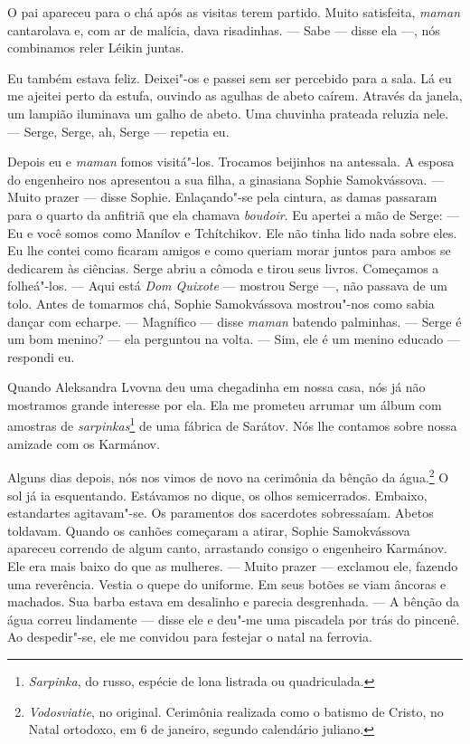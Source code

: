 O pai apareceu para o chá após as visitas terem partido. Muito
satisfeita, \emph{maman} cantarolava e, com ar de malícia, dava
risadinhas. --- Sabe --- disse ela ---, nós combinamos reler Léikin
juntas.

Eu também estava feliz. Deixei"-os e passei sem ser percebido para a
sala. Lá eu me ajeitei perto da estufa, ouvindo as agulhas de abeto
caírem. Através da janela, um lampião iluminava um galho de abeto. Uma
chuvinha prateada reluzia nele. --- Serge, Serge, ah, Serge --- repetia
eu.

Depois eu e \emph{maman} fomos visitá"-los. Trocamos beijinhos na
antessala. A esposa do engenheiro nos apresentou a sua filha, a
ginasiana Sophie Samokvássova. --- Muito prazer --- disse Sophie.
Enlaçando"-se pela cintura, as damas passaram para o quarto da anfitriã
que ela chamava \emph{boudoir}. Eu apertei a mão de Serge: --- Eu e você
somos como Manílov e Tchítchikov. Ele não tinha lido nada sobre eles. Eu
lhe contei como ficaram amigos e como queriam morar juntos para ambos se
dedicarem às ciências. Serge abriu a cômoda e tirou seus livros.
Começamos a folheá"-los. --- Aqui está \emph{Dom Quixote} --- mostrou
Serge ---, não passava de um tolo. Antes de tomarmos chá, Sophie
Samokvássova mostrou"-nos como sabia dançar com echarpe. --- Magnífico
--- disse \emph{maman} batendo palminhas. --- Serge é um bom menino? ---
ela perguntou na volta. --- Sim, ele é um menino educado --- respondi
eu.

Quando Aleksandra Lvovna deu uma chegadinha em nossa casa, nós já não
mostramos grande interesse por ela. Ela me prometeu arrumar um álbum com
amostras de \emph{sarpinkas}\footnote{\emph{Sarpinka}, do russo, espécie
  de lona listrada ou quadriculada.} de uma fábrica de Sarátov. Nós lhe
contamos sobre nossa amizade com os Karmánov.

Alguns dias depois, nós nos vimos de novo na cerimônia da bênção da
água.\footnote{\emph{Vodosviatie}, no original. Cerimônia realizada como
  o batismo de Cristo, no Natal ortodoxo, em 6 de janeiro, segundo
  calendário juliano.} O sol já ia esquentando. Estávamos no dique, os
olhos semicerrados. Embaixo, estandartes agitavam"-se. Os paramentos dos
sacerdotes sobressaíam. Abetos toldavam. Quando os canhões começaram a
atirar, Sophie Samokvássova apareceu correndo de algum canto, arrastando
consigo o engenheiro Karmánov. Ele era mais baixo do que as mulheres.
--- Muito prazer --- exclamou ele, fazendo uma reverência. Vestia o
quepe do uniforme. Em seus botões se viam âncoras e machados. Sua barba
estava em desalinho e parecia desgrenhada. --- A bênção da água correu
lindamente --- disse ele e deu"-me uma piscadela por trás do pincenê. Ao
despedir"-se, ele me convidou para festejar o natal na ferrovia.

